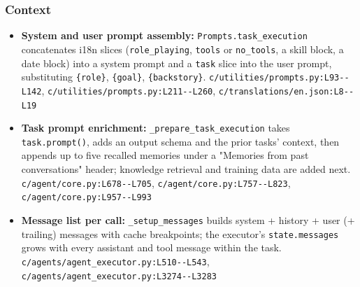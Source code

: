 \subsubsection*{Context}
\begin{itemize}
\item \textbf{System and user prompt assembly:} \texttt{Prompts.\allowbreak{}task\_\allowbreak{}execution} concatenates i18n slices (\texttt{role\_\allowbreak{}playing}, \texttt{tools} or \texttt{no\_\allowbreak{}tools}, a skill block, a date block) into a system prompt and a \texttt{task} slice into the user prompt, substituting \texttt{\{role\}}, \texttt{\{goal\}}, \texttt{\{backstory\}}. \texttt{c/\allowbreak{}utilities/\allowbreak{}prompts.\allowbreak{}py:\allowbreak{}L93-\allowbreak{}-\allowbreak{}L142}, \texttt{c/\allowbreak{}utilities/\allowbreak{}prompts.\allowbreak{}py:\allowbreak{}L211-\allowbreak{}-\allowbreak{}L260}, \texttt{c/\allowbreak{}translations/\allowbreak{}en.\allowbreak{}json:\allowbreak{}L8-\allowbreak{}-\allowbreak{}L19}
\item \textbf{Task prompt enrichment:} \texttt{\_\allowbreak{}prepare\_\allowbreak{}task\_\allowbreak{}execution} takes \texttt{task.\allowbreak{}prompt(\allowbreak{})}, adds an output schema and the prior tasks' context, then appends up to five recalled memories under a "Memories from past conversations" header; knowledge retrieval and training data are added next. \texttt{c/\allowbreak{}agent/\allowbreak{}core.\allowbreak{}py:\allowbreak{}L678-\allowbreak{}-\allowbreak{}L705}, \texttt{c/\allowbreak{}agent/\allowbreak{}core.\allowbreak{}py:\allowbreak{}L757-\allowbreak{}-\allowbreak{}L823}, \texttt{c/\allowbreak{}agent/\allowbreak{}core.\allowbreak{}py:\allowbreak{}L957-\allowbreak{}-\allowbreak{}L993}
\item \textbf{Message list per call:} \texttt{\_\allowbreak{}setup\_\allowbreak{}messages} builds system + history + user (+ trailing) messages with cache breakpoints; the executor's \texttt{state.\allowbreak{}messages} grows with every assistant and tool message within the task. \texttt{c/\allowbreak{}agents/\allowbreak{}agent\_\allowbreak{}executor.\allowbreak{}py:\allowbreak{}L510-\allowbreak{}-\allowbreak{}L543}, \texttt{c/\allowbreak{}agents/\allowbreak{}agent\_\allowbreak{}executor.\allowbreak{}py:\allowbreak{}L3274-\allowbreak{}-\allowbreak{}L3283}

\end{itemize}
